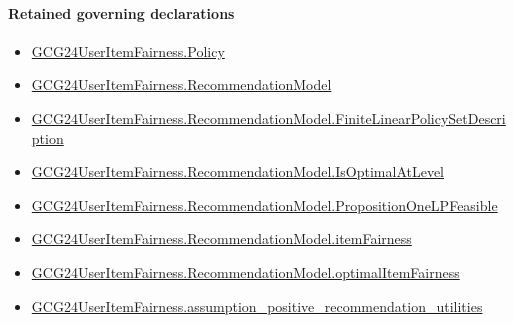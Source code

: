 \documentclass[10pt]{article}
\begin{document}
\paragraph{Retained governing declarations}
\begin{itemize}\raggedright
\item \hyperlink{governing-declaration-34ca6b905b48428a}{GCG24\allowbreak{}User\allowbreak{}Item\allowbreak{}Fairness.\allowbreak{}Policy}
\item \hyperlink{governing-declaration-4b845f20f80fb146}{GCG24\allowbreak{}User\allowbreak{}Item\allowbreak{}Fairness.\allowbreak{}Recommendation\allowbreak{}Model}
\item \hyperlink{governing-declaration-fefcfd9d20e51a98}{GCG24\allowbreak{}User\allowbreak{}Item\allowbreak{}Fairness.\allowbreak{}Recommendation\allowbreak{}Model.\allowbreak{}Finite\allowbreak{}Linear\allowbreak{}Policy\allowbreak{}Set\allowbreak{}Description}
\item \hyperlink{paper-prerequisite-4b6f9efb494da04e}{GCG24\allowbreak{}User\allowbreak{}Item\allowbreak{}Fairness.\allowbreak{}Recommendation\allowbreak{}Model.\allowbreak{}Is\allowbreak{}Optimal\allowbreak{}At\allowbreak{}Level}
\item \hyperlink{governing-declaration-c1f80811714ca6c5}{GCG24\allowbreak{}User\allowbreak{}Item\allowbreak{}Fairness.\allowbreak{}Recommendation\allowbreak{}Model.\allowbreak{}Proposition\allowbreak{}One\allowbreak{}LP\allowbreak{}Feasible}
\item \hyperlink{paper-prerequisite-f7870d3a808a042a}{GCG24\allowbreak{}User\allowbreak{}Item\allowbreak{}Fairness.\allowbreak{}Recommendation\allowbreak{}Model.\allowbreak{}item\allowbreak{}Fairness}
\item \hyperlink{governing-declaration-3079e6c40671c151}{GCG24\allowbreak{}User\allowbreak{}Item\allowbreak{}Fairness.\allowbreak{}Recommendation\allowbreak{}Model.\allowbreak{}optimal\allowbreak{}Item\allowbreak{}Fairness}
\item \hyperlink{paper-prerequisite-c3fb62153de6abb9}{GCG24\allowbreak{}User\allowbreak{}Item\allowbreak{}Fairness.\allowbreak{}assumption\_\allowbreak{}positive\_\allowbreak{}recommendation\_\allowbreak{}utilities}
\end{itemize}
\end{document}
